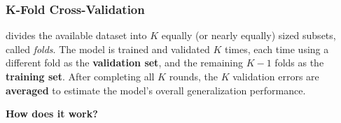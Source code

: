 \subsubsection{K-Fold Cross-Validation}

 divides the available dataset into $K$ equally (or nearly equally) sized subsets, called \emph{folds}. The model is trained and validated $K$ times, each time using a different fold as the \textbf{validation set}, and the remaining $K-1$ folds as the \textbf{training set}. After completing all $K$ rounds, the $K$ validation errors are \textbf{averaged} to estimate the model's overall generalization performance.

\highspace
\begin{flushleft}
    \textcolor{Green3}{ \textbf{How does it work?}}
\end{flushleft}

